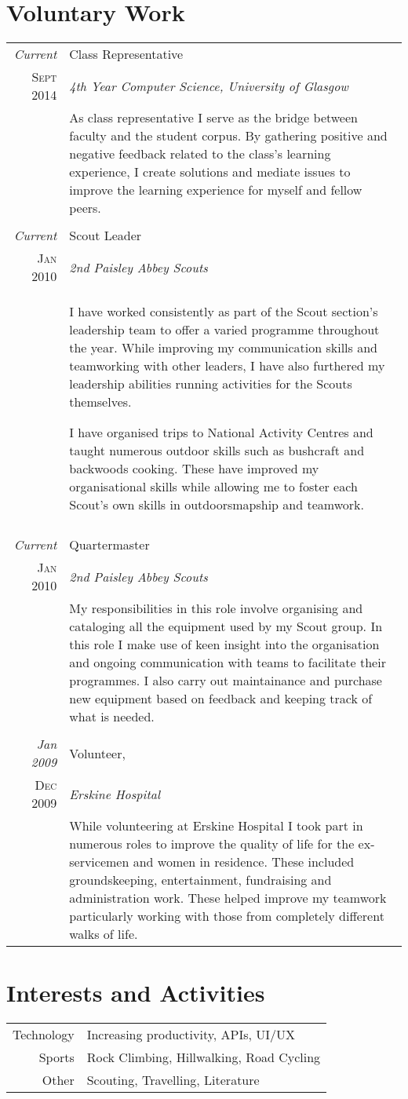 \documentclass[a4paper,10pt]{article}
\begin{document}
\section{Voluntary Work}
\begin{longtable}{r|p{11cm}}
\emph{Current} & Class Representative \\\textsc{Sept 2014}&\emph{4th Year Computer Science, University of Glasgow}\\&\footnotesize{As class representative I serve as the bridge between faculty and the student corpus. By gathering positive and negative feedback related to the class's learning experience, I create solutions and mediate issues to improve the learning experience for myself and fellow peers.}\\\multicolumn{2}{c}{} \\
\emph{Current} & Scout Leader \\\textsc{Jan 2010}&\emph{2nd Paisley Abbey Scouts}\\&\footnotesize{I have worked consistently as part of the Scout section's leadership team to offer a varied programme throughout the year. While improving my communication skills and teamworking with other leaders, I have also furthered my leadership abilities running activities for the Scouts themselves.\par I have organised trips to National Activity Centres and taught numerous outdoor skills such as bushcraft and backwoods cooking. These have improved my organisational skills while allowing me to foster each Scout's own skills in outdoorsmapship and teamwork.}\\\multicolumn{2}{c}{} \\
\pagebreak\emph{Current} & Quartermaster \\\textsc{Jan 2010}&\emph{2nd Paisley Abbey Scouts}\\&\footnotesize{My responsibilities in this role involve organising and cataloging all the equipment used by my Scout group. In this role I make use of keen insight into the organisation and ongoing communication with teams to facilitate their programmes. I also carry out maintainance and purchase new equipment based on feedback and keeping track of what is needed.}\\\multicolumn{2}{c}{} \\
\emph{Jan 2009} & Volunteer, \\\textsc{Dec 2009}&\emph{Erskine Hospital}\\&\footnotesize{While volunteering at Erskine Hospital I took part in numerous roles to improve the quality of life for the ex-servicemen and women in residence. These included groundskeeping, entertainment, fundraising and administration work. These helped improve my teamwork particularly working with those from completely different walks of life.}
\end{longtable}

\section{Interests and Activities}
\begin{tabular}{r|p{11cm}}
Technology & Increasing productivity, APIs, UI/UX\\
Sports & Rock Climbing, Hillwalking, Road Cycling\\
Other & Scouting, Travelling, Literature
\end{tabular}
\end{document}
